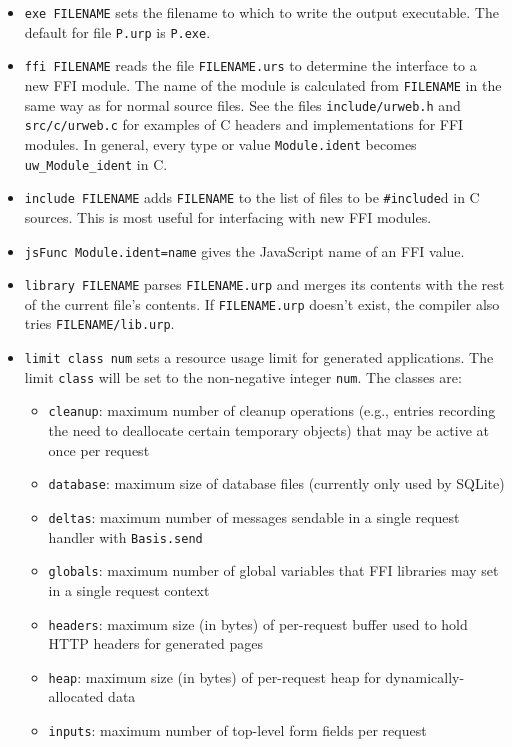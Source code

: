 \documentclass{article}
\begin{document}
\begin{itemize}
\item \texttt{exe FILENAME} sets the filename to which to write the output executable.  The default for file \texttt{P.urp} is \texttt{P.exe}.  
\item \texttt{ffi FILENAME} reads the file \texttt{FILENAME.urs} to determine the interface to a new FFI module.  The name of the module is calculated from \texttt{FILENAME} in the same way as for normal source files.  See the files \texttt{include/urweb.h} and \texttt{src/c/urweb.c} for examples of C headers and implementations for FFI modules.  In general, every type or value \texttt{Module.ident} becomes \texttt{uw\_Module\_ident} in C.
\item \texttt{include FILENAME} adds \texttt{FILENAME} to the list of files to be \texttt{\#include}d in C sources.  This is most useful for interfacing with new FFI modules.
\item \texttt{jsFunc Module.ident=name} gives the JavaScript name of an FFI value.
\item \texttt{library FILENAME} parses \texttt{FILENAME.urp} and merges its contents with the rest of the current file's contents.  If \texttt{FILENAME.urp} doesn't exist, the compiler also tries \texttt{FILENAME/lib.urp}.
\item \texttt{limit class num} sets a resource usage limit for generated applications.  The limit \texttt{class} will be set to the non-negative integer \texttt{num}.  The classes are:
  \begin{itemize}
  \item \texttt{cleanup}: maximum number of cleanup operations (e.g., entries recording the need to deallocate certain temporary objects) that may be active at once per request
  \item \texttt{database}: maximum size of database files (currently only used by SQLite)
  \item \texttt{deltas}: maximum number of messages sendable in a single request handler with \texttt{Basis.send}
  \item \texttt{globals}: maximum number of global variables that FFI libraries may set in a single request context
  \item \texttt{headers}: maximum size (in bytes) of per-request buffer used to hold HTTP headers for generated pages
  \item \texttt{heap}: maximum size (in bytes) of per-request heap for dynamically-allocated data
  \item \texttt{inputs}: maximum number of top-level form fields per request

\end{itemize}
\end{itemize}
\end{document}
